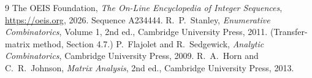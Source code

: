 \documentclass[11pt,a4paper]{article}
\theoremstyle{plain}
\theoremstyle{definition}
\begin{document}
\begin{thebibliography}{9}
 The OEIS Foundation, \emph{The On-Line Encyclopedia of Integer
Sequences}, \url{https://oeis.org}, 2026. Sequence A234444.
 R.~P.~Stanley, \emph{Enumerative Combinatorics}, Volume 1, 2nd ed.,
Cambridge University Press, 2011. (Transfer-matrix method, Section 4.7.)
 P.~Flajolet and R.~Sedgewick, \emph{Analytic Combinatorics}, Cambridge
University Press, 2009.
 R.~A.~Horn and C.~R.~Johnson, \emph{Matrix Analysis}, 2nd ed., Cambridge
University Press, 2013.
\end{thebibliography}
\end{document}
